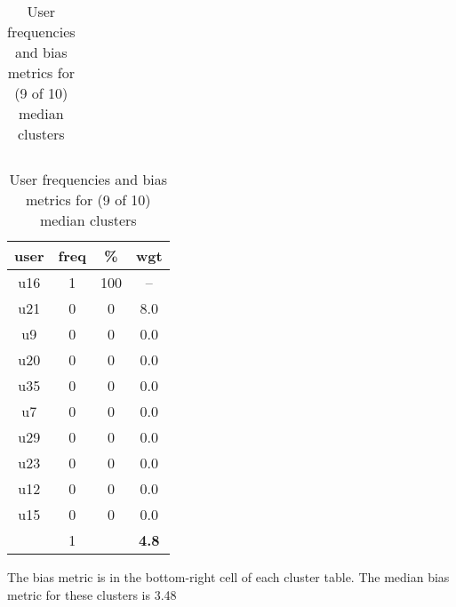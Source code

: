 \begin{appendices}
\begin{table}
\begin{tabular}{ |c|c|c|c| }
\end{tabular}
\begin{tabular}{ |c|c|c|c| }
	\hline
	\textbf{user} & \textbf{freq} & \textbf{\%} & \textbf{wgt} \\
	\hline
	u16 & 1 & 100 & -- \\
	u21 & 0 & 0 & 8.0 \\
	u9 & 0 & 0 & 0.0 \\
	u20 & 0 & 0 & 0.0 \\
	u35 & 0 & 0 & 0.0 \\
	u7 & 0 & 0 & 0.0 \\
	u29 & 0 & 0 & 0.0 \\
	u23 & 0 & 0 & 0.0 \\
	u12 & 0 & 0 & 0.0 \\
	u15 & 0 & 0 & 0.0 \\
	 & 1 & & \textbf{4.8} \\
	\hline
\end{tabular}
\caption{User frequencies and bias metrics for (9 of 10) median clusters}
{\small The bias metric is in the bottom-right cell of each cluster table. The median bias metric for these clusters is 3.48}
\end{table}


\end{appendices}
